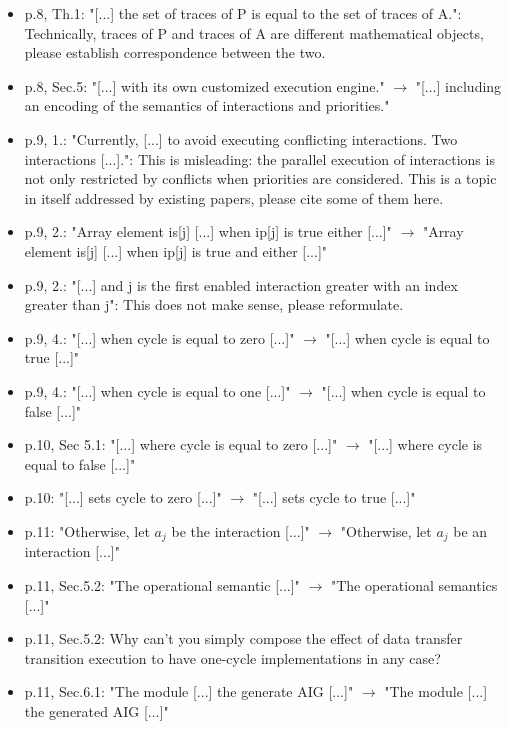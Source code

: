 \begin{itemize}
\item p.8, Th.1: "[...] the set of traces of P is equal to the set of traces of 
A.": Technically, traces of P and traces of A are different mathematical 
objects, please establish correspondence between the two.

\item p.8, Sec.5: "[...] with its own customized execution engine." $\rightarrow$ "[...] 
including an encoding of the semantics of interactions and priorities."
\item p.9, 1.: "Currently, [...] to avoid executing conflicting interactions. Two 
interactions [...].": This is misleading: the parallel execution of 
interactions is not only restricted by conflicts when priorities are 
considered. This is a topic in itself addressed by existing papers, please 
cite some of them here.
\item p.9, 2.: "Array element is[j] [...] when ip[j] is true either [...]" $\rightarrow$ 
"Array element is[j] [...] when ip[j] is true and either [...]"
\item p.9, 2.: "[...] and j is the first enabled interaction greater with an 
index greater than j": This does not make sense, please reformulate.
\item p.9, 4.: "[...] when cycle is equal to zero [...]" $\rightarrow$ "[...] when cycle is 
equal to true [...]"
\item p.9, 4.: "[...] when cycle is equal to one [...]" $\rightarrow$ "[...] when cycle is 
equal to false [...]"
\item p.10, Sec 5.1: "[...] where cycle is equal to zero [...]" $\rightarrow$ "[...] where 
cycle is equal to false [...]"
\item p.10: "[...] sets cycle to zero [...]" $\rightarrow$ "[...] sets cycle to true [...]"
\item p.11: "Otherwise, let $a_j$ be the interaction [...]" $\rightarrow$ "Otherwise, let $a_j$ 
be an interaction [...]"
\item p.11, Sec.5.2: "The operational semantic [...]" $\rightarrow$ "The operational 
semantics [...]"
\item p.11, Sec.5.2: Why can't you simply compose the effect of data transfer 
transition execution to have one-cycle implementations in any case?
\item p.11, Sec.6.1: "The module [...] the generate AIG [...]" $\rightarrow$ "The module 
[...] the generated AIG [...]"
\end{itemize}
